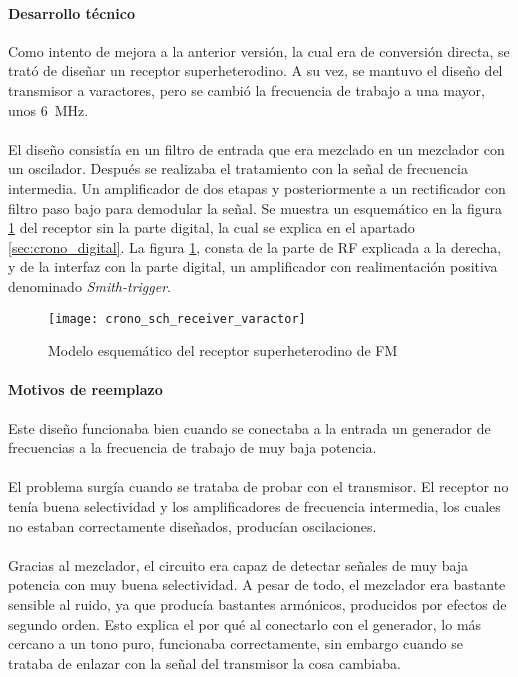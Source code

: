 \paragraph{Desarrollo técnico}
Como intento de mejora a la anterior versión, la cual era de conversión directa, se trató de diseñar un receptor superheterodino. A su vez, se mantuvo el diseño del transmisor a varactores, pero se cambió la frecuencia de trabajo a una mayor, unos \SI{6}{\mega\hertz}. 
\paragraph{}
El diseño consistía en un filtro de entrada que era mezclado en un mezclador con un oscilador. Después se realizaba el tratamiento con la señal de frecuencia intermedia. Un amplificador de dos etapas y posteriormente a un rectificador con filtro paso bajo para demodular la señal. Se muestra un esquemático en la figura \ref{fig:crono_sch_receiver_varactor} del receptor sin la parte digital, la cual se explica en el apartado \ref{sec:crono_digital}. La figura \ref{fig:crono_sch_receiver_varactor}, consta de la parte de RF explicada a la derecha, y de la interfaz con la parte digital, un amplificador con realimentaci\'on positiva denominado \textit{Smith-trigger}.

\begin{figure}[h!]
    \centering
    \texttt{[image: crono\_sch\_receiver\_varactor]}
    \caption{Modelo esquem\'atico del receptor superheterodino de FM}
    \label{fig:crono_sch_receiver_varactor}
\end{figure}

\paragraph{Motivos de reemplazo}
Este diseño funcionaba bien cuando se conectaba a la entrada un generador de frecuencias a la frecuencia de trabajo de muy baja potencia.
\paragraph{}
El problema surgía cuando se trataba de probar con el transmisor. 
El receptor no tenía buena selectividad y los amplificadores de frecuencia intermedia, los cuales no estaban correctamente diseñados, producían oscilaciones.
\paragraph{}
Gracias al mezclador, el circuito era capaz de detectar señales de muy baja potencia con muy buena selectividad. A pesar de todo, el mezclador era bastante sensible al ruido, ya que producía bastantes armónicos, producidos por efectos de segundo orden. Esto explica el por qué al conectarlo con el generador, lo más cercano a un tono puro, funcionaba correctamente, sin embargo cuando se trataba de enlazar con la señal del transmisor la cosa cambiaba.
